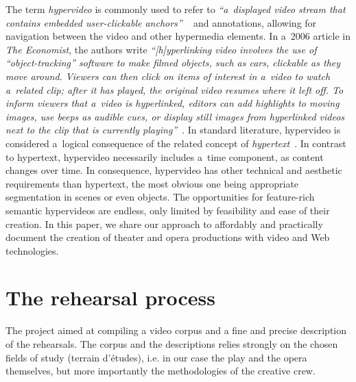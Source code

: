\documentclass[conference]{IEEEtran}
\begin{document}
The term \emph{hypervideo} is commonly used to refer to
\textit{``a~displayed video stream that contains embedded user-clickable anchors''}%
~\cite{sawhney1996hypercafe,smith2002extensible}
and annotations, allowing for navigation between the video and other hypermedia elements.
In a~2006 article in \emph{The Economist}, the authors write 
\textit{``[h]yperlinking video involves the use of ``object-tracking'' software
to make filmed objects, such as cars, clickable as they move around.
Viewers can then click on items of interest in a~video
to watch a~related clip; after it has played,
the original video resumes where it left off.
To inform viewers that a~video is hyperlinked,
editors can add highlights to moving images, use beeps as audible cues,
or display still images from hyperlinked videos
next to the clip that is currently playing''}~\cite{economist2006hypervideo}.
In standard literature, hypervideo is considered a~logical consequence
of the related concept of \emph{hypertext}~\cite{bernerslee1990hypertext}.
In contrast to hypertext, hypervideo necessarily includes a~time component,
as content changes over time.
In consequence, hypervideo has other technical and aesthetic requirements
than hypertext, the most obvious one being appropriate segmentation in scenes
or even objects.
The opportunities for feature-rich semantic hypervideos are endless,
only limited by feasibility and ease of their creation.
In this paper, we share our approach to affordably and practically document
the creation of theater and opera productions with video and Web technologies.


\section{The rehearsal process}



The project aimed at compiling a video corpus and a fine and precise description of the rehearsals. The corpus and the descriptions relies strongly on the chosen fields of study (terrain d'études), i.e. in our case the play and the opera themselves, but more importantly the methodologies of the creative crew.
\end{document}
